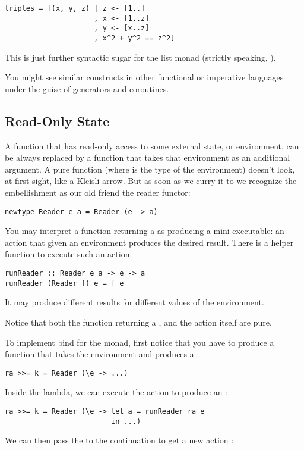 \begin{verbatim}
triples = [(x, y, z) | z <- [1..]
                     , x <- [1..z]
                     , y <- [x..z]
                     , x^2 + y^2 == z^2]
\end{verbatim}
This is just further syntactic sugar for the list monad (strictly
speaking, ).

You might see similar constructs in other functional or imperative
languages under the guise of generators and coroutines.

\subsection{Read-Only State}\label{read-only-state}

A function that has read-only access to some external state, or
environment, can be always replaced by a function that takes that
environment as an additional argument. A pure function
 (where  is the type of
the environment) doesn't look, at first sight, like a Kleisli arrow. But
as soon as we curry it to
 we recognize the
embellishment as our old friend the reader functor:

\begin{verbatim}
newtype Reader e a = Reader (e -> a)
\end{verbatim}
You may interpret a function returning a  as producing a
mini-executable: an action that given an environment produces the
desired result. There is a helper function  to execute
such an action:

\begin{verbatim}
runReader :: Reader e a -> e -> a
runReader (Reader f) e = f e
\end{verbatim}
It may produce different results for different values of the
environment.

Notice that both the function returning a , and the
 action itself are pure.

To implement bind for the  monad, first notice that you
have to produce a function that takes the environment  and
produces a :

\begin{verbatim}
ra >>= k = Reader (\e -> ...)
\end{verbatim}
Inside the lambda, we can execute the action  to produce an
:

\begin{verbatim}
ra >>= k = Reader (\e -> let a = runReader ra e
                         in ...)
\end{verbatim}
We can then pass the  to the continuation  to get a
new action :

